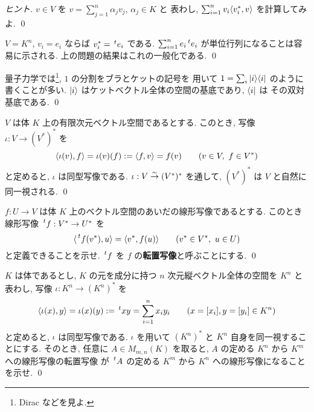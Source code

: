 \documentclass[12pt,twoside]{jarticle}
\begin{document}
\begin{proof}[ヒント]
  $v\in V$ を $v=\sum_{j=1}^n \alpha_j v_j$, $\alpha_j\in K$ と
  表わし, $\sum_{i=1}^n v_i \langle v_i^*, v\rangle$ を計算してみよ.
  \qed
\end{proof}

\begin{rem}
  $V=K^n$, $v_i=e_i$ ならば $v^*_i=\tp{e_i}$ である.
  $\sum_{i=1}^n e_i\tp{e_i}$ が単位行列になることは容易に示される.
  上の問題の結果はこれの一般化である.
  \qed
\end{rem}

\begin{guide}
  量子力学では\footnote{Dirac \cite{Dirac} などを見よ.}, 
  $1$ の分割をブラとケットの記号を
  用いて $1 = \sum_i |i\rangle \langle i|$ のように書くことが多い. 
  $|i\rangle$ はケットベクトル全体の空間の基底であり, $\langle i|$ は
  その双対基底である.
  \qed
\end{guide}


\begin{question}[双対の双対]
  $V$ は体 $K$ 上の有限次元ベクトル空間であるとする.
  このとき, 写像 $\iota: V\to (V^*)^*$ を
  \begin{equation*}
    \langle \iota(v), f\rangle = \iota(v)(f) := \langle f, v\rangle = f(v)
    \qquad (v\in V,\ f\in V^*)
  \end{equation*}
  と定めると, $\iota$ は同型写像である.
  $\iota:V\overset\sim\rightarrow (V^*)^*$ を通して, $(V^*)^*$ は $V$ と自然に同一視される.
  \qed
\end{question}


\begin{question}[転置写像]
  $f:U\to V$ は体 $K$ 上のベクトル空間のあいだの線形写像であるとする.
  このとき線形写像 $\tp{f}:V^*\to U^*$ を
  \begin{equation*}
    \bra \tp{f}(v^*), u \ket = \bra v^*, f(u)\ket
    \qquad (v^*\in V^*,\ u\in U)
  \end{equation*}
  と定義できることを示せ.  $\tp{f}$ を $f$ の{\bf 転置写像}と呼ぶことにする.
  \qed
\end{question}


\begin{question}[行列の転置との関係]
  $K$ は体であるとし, 
  $K$ の元を成分に持つ $n$ 次元縦ベクトル全体の空間を $K^n$ と表わし, 
  写像 $\iota:K^n\to(K^n)^*$ を
  \begin{equation*}
    \bra \iota(x), y\ket = \iota(x)(y) := \tp{x}y = \sum_{i=1}^n x_iy_i
    \qquad (x=[x_i], y=[y_i] \in K^n)
  \end{equation*}
  と定めると, $\iota$ は同型写像である. 
  $\iota$ を用いて $(K^n)^*$ と $K^n$ 自身を同一視することにする.
  そのとき, 任意に $A\in M_{m,n}(K)$ を取ると, 
  $A$ の定める $K^n$ から $K^m$ への線形写像の転置写像
  が $\tp{A}$ の定める $K^m$ から $K^n$ への線形写像になることを示せ.
  \qed
\end{question}
\end{document}
